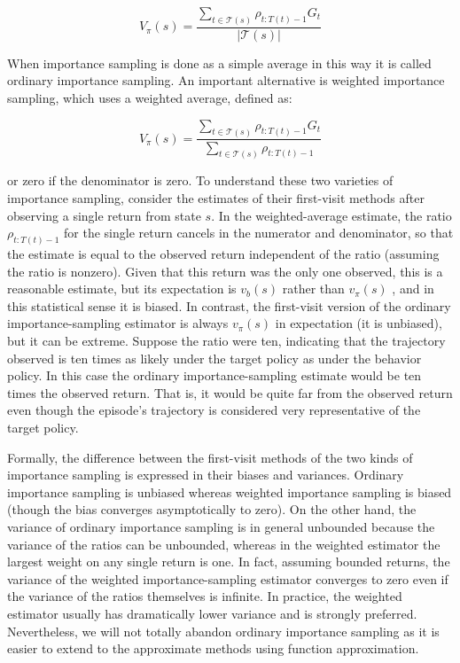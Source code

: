 \documentclass{article}
\begin{document}
$$
V _ \pi ( s ) = \frac { \sum _ { t \in \mathcal { T } ( s ) } \rho _ { t : T ( t ) - 1 } G _ { t } } { | \mathcal { T } ( s ) | }
$$

When importance sampling is done as a simple average in this way it is called ordinary importance sampling. 
An important alternative is weighted importance sampling, which uses a weighted average, defined as:

$$
V _ \pi ( s ) = \frac { \sum _ { t \in \mathcal { T } ( s ) } \rho _ { t : T ( t ) - 1 } G _ { t } } { \sum _ { t \in \mathcal { T } ( s ) } \rho _ { t : T ( t ) - 1 } }
$$

or zero if the denominator is zero. To understand these two varieties of importance sampling, 
consider the estimates of their first-visit methods after observing a single return from state $ s $. 
In the weighted-average estimate, the ratio $\rho _ { t : T ( t ) - 1 }$ for the single return cancels in the numerator and denominator, 
so that the estimate is equal to the observed return independent of the ratio (assuming the ratio is nonzero). 
Given that this return was the only one observed, this is a reasonable estimate, but its expectation is $v _ { b } ( s )$ rather than $v _ { \pi } ( s )$ , 
and in this statistical sense it is biased. In contrast, the first-visit version of the ordinary importance-sampling estimator 
is always $v _ { \pi } ( s )$ in expectation (it is unbiased), but it can be extreme. Suppose the ratio were ten, 
indicating that the trajectory observed is ten times as likely under the target policy as under the behavior policy. 
In this case the ordinary importance-sampling estimate would be ten times the observed return. 
That is, it would be quite far from the observed return even though the episode's trajectory is considered very representative of the target policy.

Formally, the difference between the first-visit methods of the two kinds of importance sampling is expressed in their biases and variances. 
Ordinary importance sampling is unbiased whereas weighted importance sampling is biased (though the bias converges asymptotically to zero). 
On the other hand, the variance of ordinary importance sampling is in general unbounded because the variance of the ratios can be unbounded, 
whereas in the weighted estimator the largest weight on any single return is one. In fact, assuming bounded returns, the variance of the 
weighted importance-sampling estimator converges to zero even if the variance of the ratios themselves is infinite. 
In practice, the weighted estimator usually has dramatically lower variance and is strongly preferred. Nevertheless, we will not totally abandon 
ordinary importance sampling as it is easier to extend to the approximate methods using function approximation.
\end{document}
